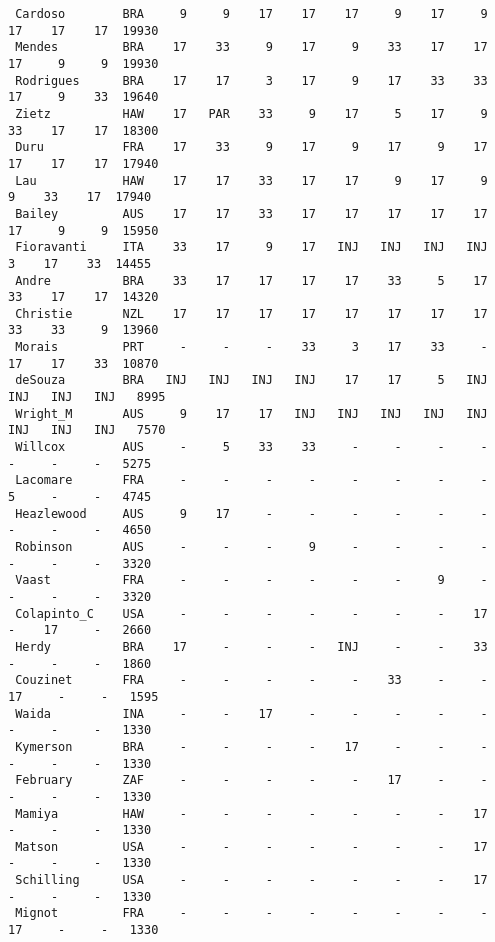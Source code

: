 \documentclass[12pt]{article}
\begin{document}
{\begin{verbatim}
 Cardoso        BRA     9     9    17    17    17     9    17     9    17    17    17  19930
 Mendes         BRA    17    33     9    17     9    33    17    17    17     9     9  19930
 Rodrigues      BRA    17    17     3    17     9    17    33    33    17     9    33  19640
 Zietz          HAW    17   PAR    33     9    17     5    17     9    33    17    17  18300
 Duru           FRA    17    33     9    17     9    17     9    17    17    17    17  17940
 Lau            HAW    17    17    33    17    17     9    17     9     9    33    17  17940
 Bailey         AUS    17    17    33    17    17    17    17    17    17     9     9  15950
 Fioravanti     ITA    33    17     9    17   INJ   INJ   INJ   INJ     3    17    33  14455
 Andre          BRA    33    17    17    17    17    33     5    17    33    17    17  14320
 Christie       NZL    17    17    17    17    17    17    17    17    33    33     9  13960
 Morais         PRT     -     -     -    33     3    17    33     -    17    17    33  10870
 deSouza        BRA   INJ   INJ   INJ   INJ    17    17     5   INJ   INJ   INJ   INJ   8995
 Wright_M       AUS     9    17    17   INJ   INJ   INJ   INJ   INJ   INJ   INJ   INJ   7570
 Willcox        AUS     -     5    33    33     -     -     -     -     -     -     -   5275
 Lacomare       FRA     -     -     -     -     -     -     -     -     5     -     -   4745
 Heazlewood     AUS     9    17     -     -     -     -     -     -     -     -     -   4650
 Robinson       AUS     -     -     -     9     -     -     -     -     -     -     -   3320
 Vaast          FRA     -     -     -     -     -     -     9     -     -     -     -   3320
 Colapinto_C    USA     -     -     -     -     -     -     -    17     -    17     -   2660
 Herdy          BRA    17     -     -     -   INJ     -     -    33     -     -     -   1860
 Couzinet       FRA     -     -     -     -     -    33     -     -    17     -     -   1595
 Waida          INA     -     -    17     -     -     -     -     -     -     -     -   1330
 Kymerson       BRA     -     -     -     -    17     -     -     -     -     -     -   1330
 February       ZAF     -     -     -     -     -    17     -     -     -     -     -   1330
 Mamiya         HAW     -     -     -     -     -     -     -    17     -     -     -   1330
 Matson         USA     -     -     -     -     -     -     -    17     -     -     -   1330
 Schilling      USA     -     -     -     -     -     -     -    17     -     -     -   1330
 Mignot         FRA     -     -     -     -     -     -     -     -    17     -     -   1330

\end{verbatim}}
\end{document}
